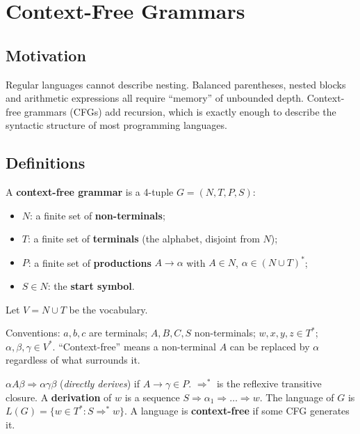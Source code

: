 \chapter{Context-Free Grammars}

\section{Motivation}

Regular languages cannot describe nesting. Balanced parentheses, nested blocks and
arithmetic expressions all require ``memory'' of unbounded depth. Context-free grammars
(CFGs) add recursion, which is exactly enough to describe the syntactic structure of most
programming languages.

\section{Definitions}

\begin{definition}
A \textbf{context-free grammar} is a 4-tuple $G = (N, T, P, S)$:
\begin{itemize}
  \item $N$: a finite set of \textbf{non-terminals};
  \item $T$: a finite set of \textbf{terminals} (the alphabet, disjoint from $N$);
  \item $P$: a finite set of \textbf{productions} $A \to \alpha$ with $A\in N$,
        $\alpha \in (N\cup T)^*$;
  \item $S\in N$: the \textbf{start symbol}.
\end{itemize}
Let $V = N\cup T$ be the vocabulary.
\end{definition}

Conventions: $a,b,c$ are terminals; $A,B,C,S$ non-terminals; $w,x,y,z \in T^*$;
$\alpha,\beta,\gamma \in V^*$. ``Context-free'' means a non-terminal $A$ can be replaced by
$\alpha$ regardless of what surrounds it.

\begin{definition}
$\alpha A \beta \Rightarrow \alpha\gamma\beta$ (\emph{directly derives}) if $A\to\gamma \in P$.
$\Rightarrow^*$ is the reflexive transitive closure. A \textbf{derivation} of $w$ is a
sequence $S \Rightarrow \alpha_1 \Rightarrow \dots \Rightarrow w$. The language of $G$ is
$L(G) = \{ w \in T^* : S \Rightarrow^* w\}$. A language is \textbf{context-free} if some CFG
generates it.
\end{definition}

